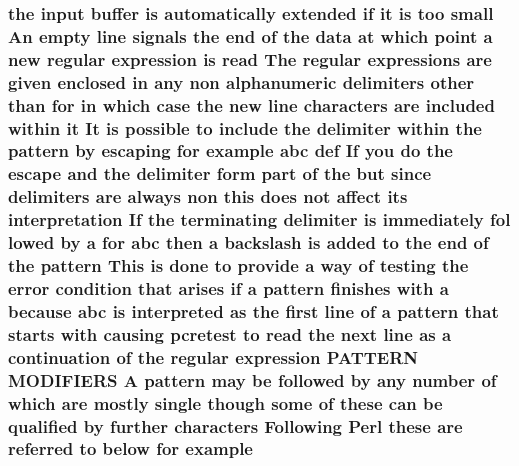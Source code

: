 \subsubsection[{\texorpdfstring{example}{example}}]{\setlength{\rightskip}{0pt plus 5cm}the {\bf input} {\bf buffer} {\bf is} automatically extended {\bf if} {\bf it} {\bf is} too small An {\bf empty} {\bf line} signals the {\bf end} {\bf of} the {\bf data} at {\bf which} {\bf point} {\bf a} new regular {\bf expression} {\bf is} {\bf read} The regular {\bf expressions} {\bf are} {\bf given} enclosed {\bf in} {\bf any} non {\bf alphanumeric} delimiters other {\bf than} for {\bf in} {\bf which} {\bf case} the new {\bf line} {\bf characters} {\bf are} {\bf included} within {\bf it} It {\bf is} {\bf possible} {\bf to} {\bf include} the delimiter within the {\bf pattern} by escaping for example {\bf abc} def If you {\bf do} the escape and the delimiter form part {\bf of} the but since delimiters {\bf are} always non {\bf this} does {\bf not} affect its interpretation If the terminating delimiter {\bf is} immediately fol lowed by {\bf a} for {\bf abc} then {\bf a} {\bf backslash} {\bf is} added {\bf to} the {\bf end} {\bf of} the {\bf pattern} This {\bf is} {\bf done} {\bf to} provide {\bf a} {\bf way} {\bf of} testing the {\bf error} condition that {\bf arises} {\bf if} {\bf a} {\bf pattern} finishes {\bf with} {\bf a} because {\bf abc} {\bf is} interpreted {\bf as} the {\bf first} {\bf line} {\bf of} {\bf a} {\bf pattern} that starts {\bf with} causing {\bf pcretest} {\bf to} {\bf read} the next {\bf line} {\bf as} {\bf a} continuation {\bf of} the regular {\bf expression} P\+A\+T\+T\+E\+RN M\+O\+D\+I\+F\+I\+E\+RS {\bf A} {\bf pattern} may {\bf be} followed by {\bf any} {\bf number} {\bf of} {\bf which} {\bf are} mostly single {\bf though} some {\bf of} these {\bf can} {\bf be} qualified by further {\bf characters} Following {\bf Perl} these {\bf are} referred {\bf to} {\bf below} for example}\hypertarget{NON-AUTOTOOLS-BUILD_8txt_ae99ebe11d4b0c56645d2dfb0e10a55f9}{}\label{NON-AUTOTOOLS-BUILD_8txt_ae99ebe11d4b0c56645d2dfb0e10a55f9}
